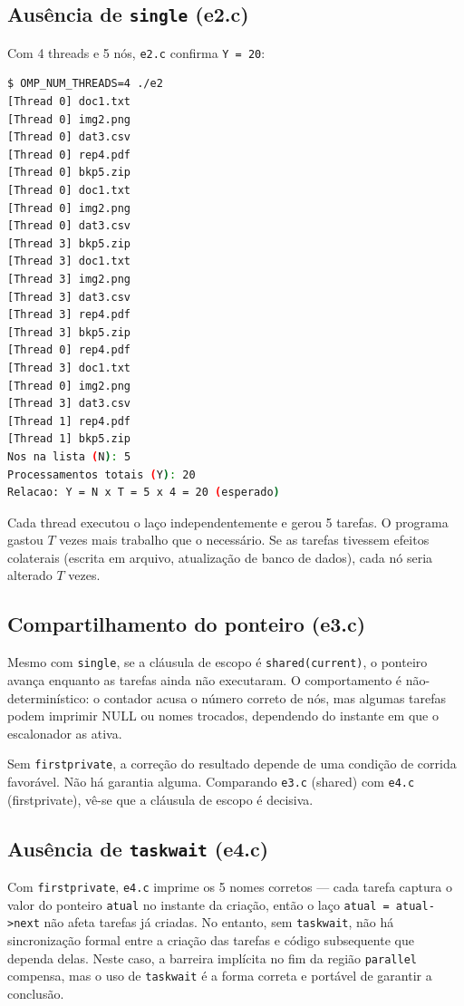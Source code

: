 \documentclass[11pt,letterpaper]{article}
\begin{document}
\subsection{Ausência de \texttt{single} (e2.c)}
Com 4 threads e 5 nós, \texttt{e2.c} confirma \texttt{Y = 20}:

\begin{lstlisting}[language=bash, caption={Saída de e2.c com 4 threads confirmando $N \times T$}]
$ OMP_NUM_THREADS=4 ./e2
[Thread 0] doc1.txt
[Thread 0] img2.png
[Thread 0] dat3.csv
[Thread 0] rep4.pdf
[Thread 0] bkp5.zip
[Thread 0] doc1.txt
[Thread 0] img2.png
[Thread 0] dat3.csv
[Thread 3] bkp5.zip
[Thread 3] doc1.txt
[Thread 3] img2.png
[Thread 3] dat3.csv
[Thread 3] rep4.pdf
[Thread 3] bkp5.zip
[Thread 0] rep4.pdf
[Thread 3] doc1.txt
[Thread 0] img2.png
[Thread 3] dat3.csv
[Thread 1] rep4.pdf
[Thread 1] bkp5.zip
Nos na lista (N): 5
Processamentos totais (Y): 20
Relacao: Y = N x T = 5 x 4 = 20 (esperado)
\end{lstlisting}

Cada thread executou o laço independentemente e gerou 5 tarefas. O programa gastou $T$ vezes mais trabalho que o necessário. Se as tarefas tivessem efeitos colaterais (escrita em arquivo, atualização de banco de dados), cada nó seria alterado $T$ vezes.

\subsection{Compartilhamento do ponteiro (e3.c)}
Mesmo com \texttt{single}, se a cláusula de escopo é \texttt{shared(current)}, o ponteiro avança enquanto as tarefas ainda não executaram. O comportamento é não-determinístico: o contador acusa o número correto de nós, mas algumas tarefas podem imprimir NULL ou nomes trocados, dependendo do instante em que o escalonador as ativa.

Sem \texttt{firstprivate}, a correção do resultado depende de uma condição de corrida favorável. Não há garantia alguma. Comparando \texttt{e3.c} (shared) com \texttt{e4.c} (firstprivate), vê-se que a cláusula de escopo é decisiva.

\subsection{Ausência de \texttt{taskwait} (e4.c)}
Com \texttt{firstprivate}, \texttt{e4.c} imprime os 5 nomes corretos — cada tarefa captura o valor do ponteiro \texttt{atual} no instante da criação, então o laço \texttt{atual = atual->next} não afeta tarefas já criadas. No entanto, sem \texttt{taskwait}, não há sincronização formal entre a criação das tarefas e código subsequente que dependa delas. Neste caso, a barreira implícita no fim da região \texttt{parallel} compensa, mas o uso de \texttt{taskwait} é a forma correta e portável de garantir a conclusão.
\end{document}

